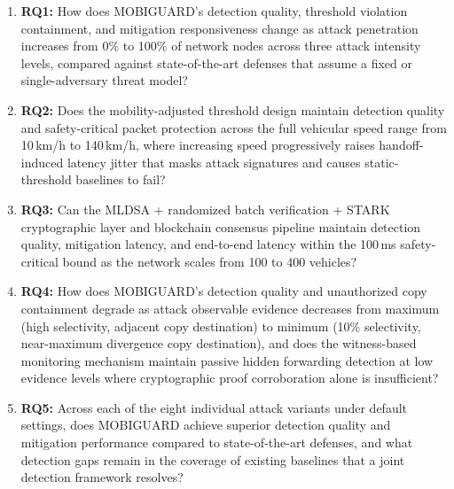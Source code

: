 \documentclass[12pt, a4paper]{report}
\begin{document}
\begin{enumerate}
    
    \item \textbf{RQ1:}
    How does MOBIGUARD's detection quality, threshold
    violation containment, and mitigation responsiveness
    change as attack penetration increases from 0\% to
    100\% of network nodes across three attack intensity
    levels, compared against state-of-the-art defenses
    that assume a fixed or single-adversary threat model?
    
    \item \textbf{RQ2:}
    Does the mobility-adjusted threshold design maintain
    detection quality and safety-critical packet
    protection across the full vehicular speed range
    from 10\,km/h to 140\,km/h, where increasing speed
    progressively raises handoff-induced latency jitter
    that masks attack signatures and causes
    static-threshold baselines to fail?
    
    \item \textbf{RQ3:}
    Can the \ac{MLDSA} + randomized batch verification
    + \ac{STARK} cryptographic layer and blockchain
    consensus pipeline maintain detection quality,
    mitigation latency, and end-to-end latency within
    the 100\,ms safety-critical bound as the network
    scales from 100 to 400 vehicles?
    
    \item \textbf{RQ4:}
    How does MOBIGUARD's detection quality and
    unauthorized copy containment degrade as attack
    observable evidence decreases from maximum
    (high selectivity, adjacent copy destination)
    to minimum (10\% selectivity, near-maximum
    divergence copy destination), and does the
    witness-based monitoring mechanism maintain
    passive hidden forwarding detection at low
    evidence levels where cryptographic proof
    corroboration alone is insufficient?
    
    \item \textbf{RQ5:}
    Across each of the eight individual attack variants
    under default settings, does MOBIGUARD achieve
    superior detection quality and mitigation performance
    compared to state-of-the-art defenses, and what
    detection gaps remain in the coverage of existing
    baselines that a joint detection framework resolves?

\end{enumerate}


\vspace{0.5\baselineskip}
\end{document}
